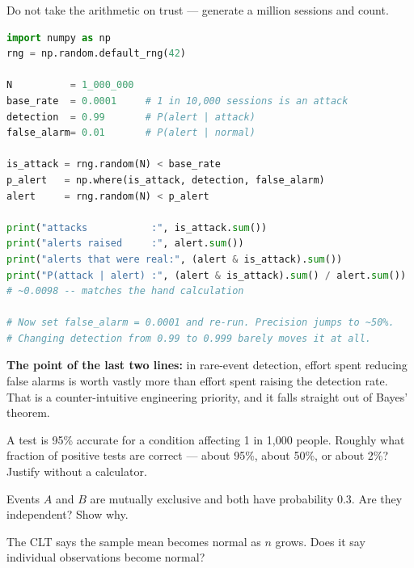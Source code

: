 \begin{lab}
Do not take the arithmetic on trust --- generate a million sessions and count.

\begin{lstlisting}[language=Python]
import numpy as np
rng = np.random.default_rng(42)

N          = 1_000_000
base_rate  = 0.0001     # 1 in 10,000 sessions is an attack
detection  = 0.99       # P(alert | attack)
false_alarm= 0.01       # P(alert | normal)

is_attack = rng.random(N) < base_rate
p_alert   = np.where(is_attack, detection, false_alarm)
alert     = rng.random(N) < p_alert

print("attacks           :", is_attack.sum())
print("alerts raised     :", alert.sum())
print("alerts that were real:", (alert & is_attack).sum())
print("P(attack | alert) :", (alert & is_attack).sum() / alert.sum())
# ~0.0098 -- matches the hand calculation

# Now set false_alarm = 0.0001 and re-run. Precision jumps to ~50%.
# Changing detection from 0.99 to 0.999 barely moves it at all.
\end{lstlisting}

\textbf{The point of the last two lines:} in rare-event detection, effort spent
reducing false alarms is worth vastly more than effort spent raising the detection
rate. That is a counter-intuitive engineering priority, and it falls straight out
of Bayes' theorem.
\end{lab}

\begin{checkpoint}
\begin{tightnum}
  \item A test is 95\% accurate for a condition affecting 1 in 1{,}000 people.
        Roughly what fraction of positive tests are correct --- about 95\%, about
        50\%, or about 2\%? Justify without a calculator.
  \item Events $A$ and $B$ are mutually exclusive and both have probability 0.3.
        Are they independent? Show why.
  \item The CLT says the sample mean becomes normal as $n$ grows. Does it say
        individual observations become normal?
\end{tightnum}
\end{checkpoint}

